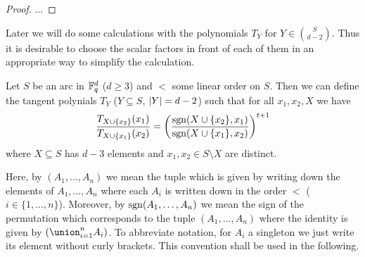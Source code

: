 \documentclass[a4paper]{article}
\begin{document}
\begin{proof}
  ... 
\end{proof}

Later we will do some calculations with the polynomials $T_Y$ for $Y\in\binom{S}{d-2}$. Thus it is desirable to choose the scalar factors in front of each of them in an appropriate way to simplify the calculation.

\begin{lemma}
  Let $S$ be an arc in $\mathbb{F}_{q}^d$ ($d\geq 3$) and $<$ some linear
  order on $S$. Then we can define the tangent polynials $T_Y$
  ($Y\subseteq S$, $\left|Y\right|=d-2$) such that for all $x_1,x_2,X$ we have
  \begin{equation}
    \frac{T_{X\cup\{x_2\}}(x_1)}{T_{X\cup\{x_1\}}(x_2)}=\left(\frac{\mathop\mathrm{sgn}(X\cup\{x_2\},x_1)}{\mathop\mathrm{sgn}(X\cup\{x_1\},x_2)}\right)^{t+1}
  \end{equation}
  where $X\subseteq S$ has $d-3$ elements and $x_1,x_2\in S\setminus X$ are distinct.
\end{lemma}

\begin{remark}
  Here, by $(A_1,\ldots,A_n)$ we mean the tuple
  which is given by writing down the elements of $A_1,\ldots,A_n$
  where each $A_i$ is written down in the order $<$
  ($i\in\{1,\ldots,n\}$). Moreover, by $\mathop\mathrm{sgn}(A_1,\ldots,A_n)$ we mean
  the sign of the permutation which corresponds to the tuple $(A_1,\ldots,A_n)$
  where the identity is given by $(\union_{i=1}^n{A_i})$. To abbreviate notation, for $A_i$ a singleton we just write its
  element without curly brackets.  
  This convention shall be used in the following.
\end{remark}
\end{document}
